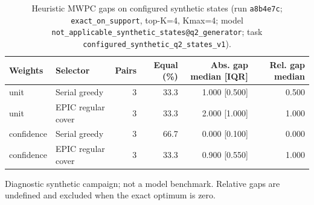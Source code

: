 \begin{table}[t]
\centering
\caption{Heuristic MWPC gaps on configured synthetic states (run \texttt{a8b4e7c}; \texttt{exact\_on\_support}, top-K=4, Kmax=4; model \texttt{not\_applicable\_synthetic\_states@q2\_generator}; task \texttt{configured\_synthetic\_q2\_states\_v1}).}
\label{tab:mwpc-heuristic-gaps}
\begin{tabular}{llrrrr}
\toprule
Weights & Selector & Pairs & Equal (\%) & Abs. gap median [IQR] & Rel. gap median \\
\midrule
unit & Serial greedy & 3 & 33.3 & 1.000 [0.500] & 0.500 \\
unit & EPIC regular cover & 3 & 33.3 & 2.000 [1.000] & 1.000 \\
confidence & Serial greedy & 3 & 66.7 & 0.000 [0.100] & 0.000 \\
confidence & EPIC regular cover & 3 & 33.3 & 0.900 [0.550] & 1.000 \\
\bottomrule
\end{tabular}
\par\footnotesize Diagnostic synthetic campaign; not a model benchmark. Relative gaps are undefined and excluded when the exact optimum is zero.
\end{table}
